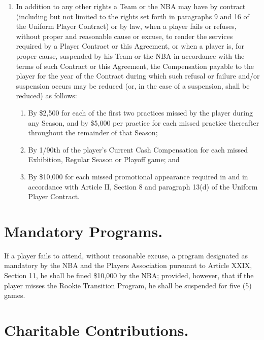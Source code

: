 \documentclass[
]{book}
\providecommand{\tightlist}{%
  \setlength{\itemsep}{0pt}\setlength{\parskip}{0pt}}
\begin{document}
\begin{enumerate}
\def\labelenumi{(\alph{enumi})}
\tightlist
\item
  In addition to any other rights a Team or the NBA may have by contract (including but not limited to the rights set forth in paragraphs 9 and 16 of the Uniform Player Contract) or by law, when a player fails or refuses, without proper and reasonable cause or excuse, to render the services required by a Player Contract or this Agreement, or when a player is, for proper cause, suspended by his Team or the NBA in accordance with the terms of such Contract or this Agreement, the Compensation payable to the player for the year of the Contract during which such refusal or failure and/or suspension occurs may be reduced (or, in the case of a suspension, shall be reduced) as follows:

  \begin{enumerate}
  \def\labelenumii{(\roman{enumii})}
  \tightlist
  \item
    By \$2,500 for each of the first two practices missed by the player during any Season, and by \$5,000 per practice for each missed practice thereafter throughout the remainder of that Season;
  \item
    By 1/90th of the player's Current Cash Compensation for each missed Exhibition, Regular Season or Playoff game; and
  \item
    By \$10,000 for each missed promotional appearance required in and in accordance with Article II, Section 8 and paragraph 13(d) of the Uniform Player Contract.
  \end{enumerate}
\end{enumerate}

\hypertarget{mandatory-programs.}{%
\section{Mandatory Programs.}\label{mandatory-programs.}}

If a player fails to attend, without reasonable excuse, a program designated as mandatory by the NBA and the Players Association pursuant to Article XXIX, Section 11, he shall be fined \$10,000 by the NBA; provided, however, that if the player misses the Rookie Transition Program, he shall be suspended for five (5) games.

\hypertarget{charitable-contributions.}{%
\section{Charitable Contributions.}\label{charitable-contributions.}}
\end{document}
